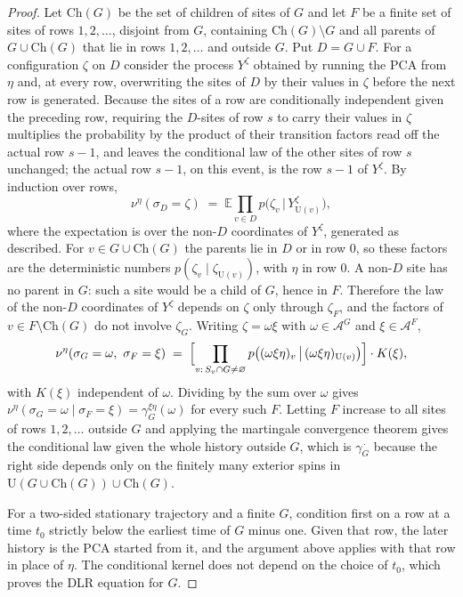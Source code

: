 \documentclass[11pt]{article}
\theoremstyle{plain}
\theoremstyle{definition}
\theoremstyle{remark}
\newcommand{\A}{\mathcal{A}}
\newcommand{\E}{\mathbb{E}}
\newcommand{\Ue}{\mathrm{U}}
\begin{document}
\begin{proof}
Let $\mathrm{Ch}(G)$ be the set of children of sites of $G$ and let $F$ be a finite set of sites of rows $1,2,\dots$, disjoint from $G$, containing $\mathrm{Ch}(G)\setminus G$ and all parents of $G\cup\mathrm{Ch}(G)$ that lie in rows $1,2,\dots$ and outside $G$. Put $D=G\cup F$. For a configuration $\zeta$ on $D$ consider the process $Y^\zeta$ obtained by running the PCA from $\eta$ and, at every row, overwriting the sites of $D$ by their values in $\zeta$ before the next row is generated. Because the sites of a row are conditionally independent given the preceding row, requiring the $D$-sites of row $s$ to carry their values in $\zeta$ multiplies the probability by the product of their transition factors read off the actual row $s-1$, and leaves the conditional law of the other sites of row $s$ unchanged; the actual row $s-1$, on this event, is the row $s-1$ of $Y^\zeta$. By induction over rows,
\[
\nu^\eta(\sigma_D=\zeta)\;=\;\E\prod_{v\in D}p\bigl(\zeta_v\,\big|\,Y^\zeta_{\Ue(v)}\bigr),
\]
where the expectation is over the non-$D$ coordinates of $Y^\zeta$, generated as described.
For $v\in G\cup\mathrm{Ch}(G)$ the parents lie in $D$ or in row $0$, so these factors are the deterministic numbers $p(\zeta_v\mid\zeta_{\Ue(v)})$, with $\eta$ in row $0$. A non-$D$ site has no parent in $G$: such a site would be a child of $G$, hence in $F$. Therefore the law of the non-$D$ coordinates of $Y^\zeta$ depends on $\zeta$ only through $\zeta_F$, and the factors of $v\in F\setminus\mathrm{Ch}(G)$ do not involve $\zeta_G$. Writing $\zeta=\omega\xi$ with $\omega\in\A^G$ and $\xi\in\A^F$,
\[
\nu^\eta(\sigma_G=\omega,\ \sigma_F=\xi)\;=\;\Bigl[\prod_{v:\,S_v\cap G\neq\varnothing}p\bigl((\omega\xi\eta)_v\,\big|\,(\omega\xi\eta)_{\Ue(v)}\bigr)\Bigr]\cdot K(\xi),
\]
with $K(\xi)$ independent of $\omega$. Dividing by the sum over $\omega$ gives $\nu^\eta(\sigma_G=\omega\mid\sigma_F=\xi)=\gamma^{\xi\eta}_G(\omega)$ for every such $F$. Letting $F$ increase to all sites of rows $1,2,\dots$ outside $G$ and applying the martingale convergence theorem gives the conditional law given the whole history outside $G$, which is $\gamma^{\,\cdot}_G$ because the right side depends only on the finitely many exterior spins in $\Ue(G\cup\mathrm{Ch}(G))\cup\mathrm{Ch}(G)$.

For a two-sided stationary trajectory and a finite $G$, condition first on a row at a time $t_0$ strictly below the earliest time of $G$ minus one. Given that row, the later history is the PCA started from it, and the argument above applies with that row in place of $\eta$. The conditional kernel does not depend on the choice of $t_0$, which proves the DLR equation for $G$.
\end{proof}
\end{document}
